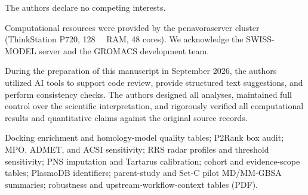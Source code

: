\documentclass[journal=jcisd8,manuscript=article,layout=traditional]{achemso}
\begin{document}
The authors declare no competing interests.

\begin{acknowledgement}
Computational resources were provided by the penavoraserver cluster (ThinkStation P720, \qty{128}{\giga\byte} RAM, \num{48} cores). We acknowledge the SWISS-MODEL server and the GROMACS development team.

During the preparation of this manuscript in September 2026, the authors utilized AI tools to support code review, provide structured text suggestions, and perform consistency checks. The authors designed all analyses, maintained full control over the scientific interpretation, and rigorously verified all computational results and quantitative claims against the original source records.
\end{acknowledgement}


\begin{suppinfo}
Docking enrichment and homology-model quality tables; P2Rank box audit; MPO, ADMET, and ACSI sensitivity; RRS radar profiles and threshold sensitivity; PNS imputation and Tartarus calibration; cohort and evidence-scope tables; PlasmoDB identifiers; parent-study and Set-C pilot MD/MM-GBSA summaries; robustness and upstream-workflow-context tables (PDF).
\end{suppinfo}



\end{document}
